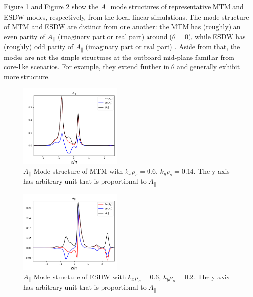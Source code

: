 \documentclass[
 aip,
 amsmath,amssymb,
 reprint
]{revtex4-1}
\begin{document}
Figure \ref{fig:MTM_Apar_mode} and  Figure \ref{fig:ETG_Apar_mode} show the $A_{\|}$ mode structures of representative MTM and ESDW modes, respectively, from the local linear simulations.  The mode structure of MTM and ESDW are distinct from one another: the MTM has (roughly) an even parity of $A_{\|}$ (imaginary part or real part) around ($\theta = 0$), while ESDW has (roughly) odd parity of $A_{\|}$ (imaginary part or real part) \cite{MJ_ESDW}. Aside from that, the modes are not the simple structures at the outboard mid-plane familiar from core-like scenarios.  For example, they extend further in $\theta$ and generally exhibit more structure.  


\begin{figure}[ht]
        \includegraphics[width=0.45\textwidth]{7.png}
        \centering
        \caption[font=5]{$A_{\|}$ Mode structure of MTM with $k_x\rho_s=0.6$, $k_y\rho_s=0.14$. The y axis has arbitrary unit that is proportional to $A_{\|}$}
        \label{fig:MTM_Apar_mode}
\end{figure}

\begin{figure}[ht]
        \includegraphics[width=0.45\textwidth]{8.png}
        \centering
        \caption[font=5]{$A_{\|}$ Mode structure of ESDW with $k_x\rho_s=0.6$, $k_y\rho_s=0.2$. The y axis has arbitrary unit that is proportional to $A_{\|}$}
        \label{fig:ETG_Apar_mode}
\end{figure}
\end{document}
